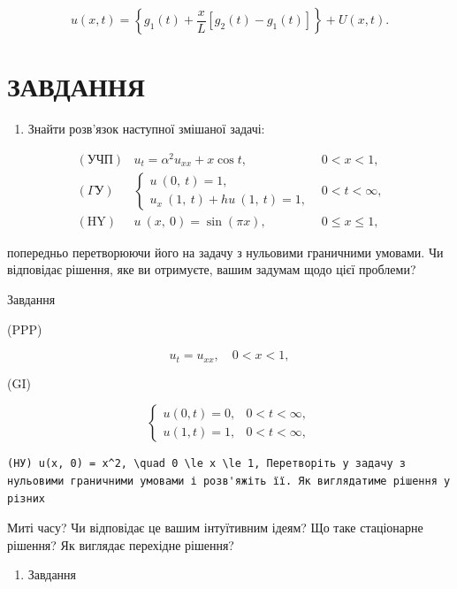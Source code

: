 \documentclass[
  ukrainian,
]{article}
\providecommand{\tightlist}{%
  \setlength{\itemsep}{0pt}\setlength{\parskip}{0pt}}
\begin{document}
\[
u(x, t) = \left\{ g_1(t) + \frac{x}{L} \left[ g_2(t) - g_1(t) \right] \right\} + U(x, t).
\]

\section{ЗАВДАННЯ}\label{ux437ux430ux432ux434ux430ux43dux43dux44f-4}

\begin{enumerate}
\def\labelenumi{\arabic{enumi}.}
\tightlist
\item
  Знайти розв'язок наступної змішаної задачі:
\end{enumerate}

\[
\begin{array}{lll} (\text{УЧП}) & u_t = \alpha^2 u_{xx} + x \cos t, & 0 < x < 1, \\ (\Gamma \text{У}) & \begin{cases} u \ (0, \ t) = 1, \\ u_x \ (1, \ t) + hu \ (1, \ t) = 1, \end{cases} & 0 < t < \infty, \\ (\text{HY}) & u \ (x, \ 0) = \sin (\pi x), & 0 \leqslant x \leqslant 1, \end{array}
\]

попередньо перетворюючи його на задачу з нульовими граничними умовами.
Чи відповідає рішення, яке ви отримуєте, вашим задумам щодо цієї
проблеми?

Завдання

(PPP)

\[
u_t = u_{xx}, \quad 0 < x < 1,
\]

(GI)

\[
\begin{cases} u(0, t) = 0, & 0 < t < \infty, \\ u(1, t) = 1, & 0 < t < \infty, \end{cases}
\]

\begin{verbatim}
(НУ) u(x, 0) = x^2, \quad 0 \le x \le 1, Перетворіть у задачу з нульовими граничними умовами і розв'яжіть її. Як виглядатиме рішення у різних
\end{verbatim}

Миті часу? Чи відповідає це вашим інтуїтивним ідеям? Що таке стаціонарне
рішення? Як виглядає перехідне рішення?

\begin{enumerate}
\def\labelenumi{\arabic{enumi}.}
\setcounter{enumi}{2}
\tightlist
\item
  Завдання
\end{enumerate}
\end{document}
